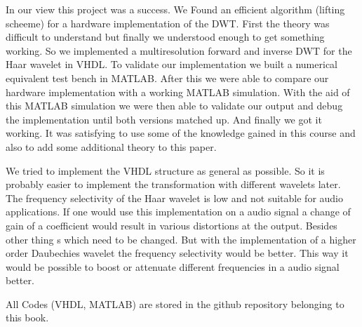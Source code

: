 \begin{refsection}
In our view this project was a success.
We Found an efficient algorithm (lifting scheeme) for a hardware implementation of the DWT.
First the theory was difficult to understand but finally we understood enough to get something working.
So we implemented a multiresolution forward and inverse DWT for the Haar wavelet in VHDL. 
To validate our implementation we built a numerical equivalent test bench in MATLAB.
After this we were able to compare our hardware implementation with a working MATLAB simulation. 
With the aid of this MATLAB simulation we were then able to validate our output and debug the implementation until both versions matched up.
And finally we got it working.
It was satisfying to use some of the knowledge gained in this course and also to add some additional theory to this paper.

We tried to implement the VHDL structure as general as possible.
So it is probably easier to implement the transformation with different wavelets later. 
The frequency selectivity of the Haar wavelet is low and not suitable for audio applications.
If one would use this implementation on a audio signal a change of gain of a coefficient would result in various distortions at the output. 
Besides other thing s which need to be changed.
But with the implementation of a higher order Daubechies wavelet the frequency selectivity would be better.
This way it would be possible to boost or attenuate different frequencies in a audio signal better. 

All Codes (VHDL, MATLAB) are stored in the github repository belonging to this book. \cite{fpga:gitrepo-wavelets}


\printbibliography[heading=subbibliography]
\end{refsection}

